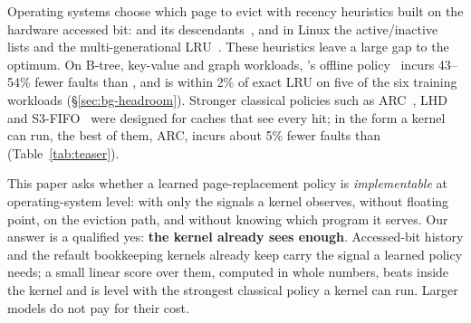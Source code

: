 
Operating systems choose which page to evict with recency heuristics built on the
hardware accessed bit: \clock and its descendants~\citep{corbato1968paging,carr1981wsclock},
and in Linux the active/inactive lists and the multi-generational LRU~\citep{linux_mglru}.
These heuristics leave a large gap to the optimum. On B-tree, key-value and graph
workloads, \belady's offline policy~\citep{belady1966study} incurs 43--54\% fewer faults
than \clock, and \clock is within 2\% of exact LRU on five of the six training
workloads (\S\ref{sec:bg-headroom}). Stronger classical policies such as
ARC~\citep{megiddo2003arc}, LHD~\citep{beckmann2018lhd} and
S3-FIFO~\citep{yang2023s3fifo} were designed for caches that see every hit; in the form
a kernel can run, the best of them, ARC, incurs about 5\% fewer faults than \clock
(Table~\ref{tab:teaser}).


This paper asks whether a learned page-replacement policy is \emph{implementable} at
operating-system level: with only the signals a kernel observes, without floating point,
on the eviction path, and without knowing which program it serves. Our answer is a
qualified yes: \textbf{the kernel already sees enough}. Accessed-bit history and the
refault bookkeeping kernels already keep carry the signal a learned policy needs; a
small linear score over them, computed in whole numbers, beats \clock inside the kernel
and is level with the strongest classical policy a kernel can run. Larger models do not
pay for their cost.

